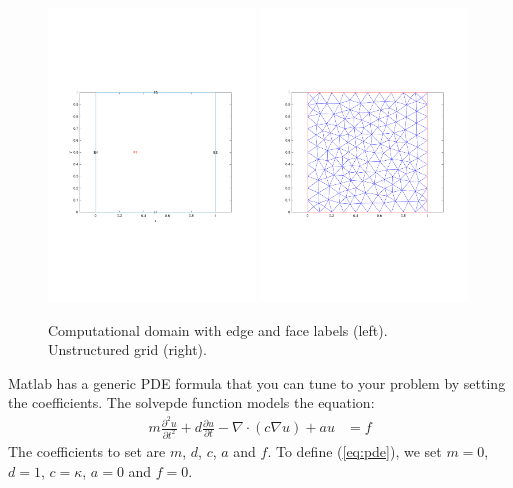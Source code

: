 \documentclass[11pt, a4paper]{article}
\begin{document}
\begin{figure}
  \includegraphics[width=0.49\textwidth]{assets/domain.pdf}
  \includegraphics[width=0.49\textwidth]{assets/mesh.pdf}
  \caption{Computational domain with edge and face labels (left). Unstructured grid (right).}\label{fig:domain}
\end{figure}

Matlab has a generic PDE formula that you can tune to your problem by setting the coefficients. The solvepde function models the equation:
\begin{align}
m\frac{\partial^2 u}{\partial t^2} + d\frac{\partial u}{\partial t} - \nabla \cdot (c\nabla u) + au &= f \label{eq:pde_ref}	
\end{align}
The coefficients to set are $m$, $d$, $c$, $a$ and $f$. To define (\ref{eq:pde}), we set $m=0$, $d=1$, $c=\kappa$, $a=0$ and $f=0$.
\end{document}
